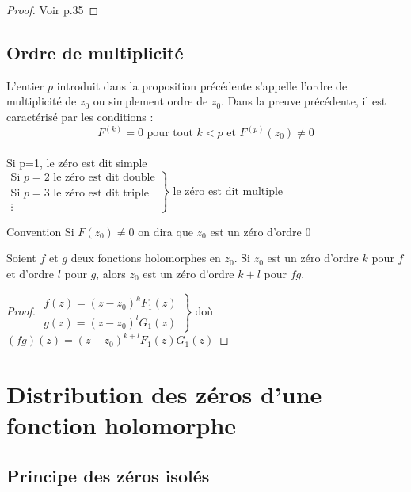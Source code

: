 \documentclass[]{report}
\begin{document}
\begin{proof}{}{}
    Voir p.35
\end{proof}

\subsection{Ordre de multiplicité}

L'entier $p$ introduit dans la proposition précédente s'appelle l'ordre de multiplicité de $z_0$ ou simplement ordre de $z_0$. Dans la preuve précédente, il est caractérisé par les conditions :\\
$$F^{(k)}=0\text{ pour tout }k<p \text{ et }F^{(p)}(z_0)\neq 0$$\\
     Si p=1, le zéro est dit simple\\
$\left.\begin{array}{ll}
 \text{Si }p=2\text{ le zéro est dit double}\\
 \text{Si }p=3\text{ le zéro est dit triple}\\
 \vdots\end{array}\right\} \text{ le zéro est dit multiple}$

\begin{nt}{Convention}{}
    Si $F(z_0)\neq 0$ on dira que $z_0$ est un zéro d'ordre $0$
\end{nt}

\begin{lm}{}{}
    Soient $f$ et $g$ deux fonctions holomorphes en $z_0$. Si $z_0$ est un zéro d'ordre $k$ pour $f$ et d'ordre $l$ pour $g$, alors $z_0$ est un zéro d'ordre $k+l$ pour $fg$.
\end{lm}

\begin{proof}{}{}
    $\left.\begin{array}{ll}
        f(z)=(z-z_0)^kF_1(z)\\
        g(z)=(z-z_0)^lG_1(z)
    \end{array}\right\}$ doù $(fg)(z)=(z-z_0)^{k+l}F_1(z)G_1(z)$
\end{proof}

\section{Distribution des zéros d'une fonction holomorphe}

\subsection{Principe des zéros isolés}
\end{document}
